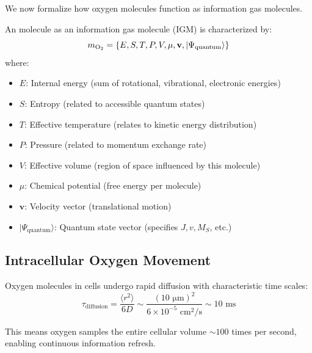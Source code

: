 We now formalize how oxygen molecules function as information gas molecules.

\begin{definition}
\label{def:info_gas_molecule}
An  molecule as an information gas molecule (IGM) is characterized by:
\begin{equation}
m_{\ce{O2}} = \{E, S, T, P, V, \mu, \mathbf{v}, |\Psi_{\text{quantum}}\rangle\}
\end{equation}
where:
\begin{itemize}
\item $E$: Internal energy (sum of rotational, vibrational, electronic energies)
\item $S$: Entropy (related to accessible quantum states)
\item $T$: Effective temperature (relates to kinetic energy distribution)
\item $P$: Pressure (related to momentum exchange rate)
\item $V$: Effective volume (region of space influenced by this molecule)
\item $\mu$: Chemical potential (free energy per molecule)
\item $\mathbf{v}$: Velocity vector (translational motion)
\item $|\Psi_{\text{quantum}}\rangle$: Quantum state vector (specifies $J, v, M_S$, etc.)
\end{itemize}
\end{definition}

\subsection{Intracellular Oxygen Movement}

\begin{theorem}
\label{thm:oxygen_diffusion}
Oxygen molecules in cells undergo rapid diffusion with characteristic time scales:
\begin{equation}
\tau_{\text{diffusion}} = \frac{\langle r^2 \rangle}{6D} \sim \frac{(10 \text{ μm})^2}{6 \times 10^{-5} \text{ cm}^2/\text{s}} \sim 10 \text{ ms}
\end{equation}

This means oxygen samples the entire cellular volume $\sim 100$ times per second, enabling continuous information refresh.
\end{theorem}

